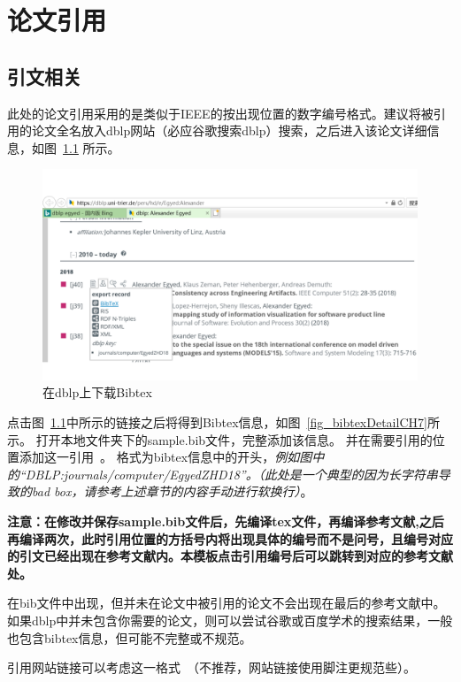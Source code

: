 \chapter{论文引用}

\section{引文相关}
此处的论文引用采用的是类似于IEEE的按出现位置的数字编号格式。建议将被引用的论文全名放入dblp网站（必应谷歌搜索dblp）搜索，之后进入该论文详细信息，如图~\ref{fig_dblpForBibtexCH7} 所示。

\begin{figure}[htb]
  \centering
  \includegraphics[width=5in]{figure/chapter7/dblpForBibtex.pdf}
  \caption{在dblp上下载Bibtex}\label{fig_dblpForBibtexCH7}
\end{figure}

点击图~\ref{fig_dblpForBibtexCH7}中所示的链接之后将得到Bibtex信息，如图~\ref{fig_bibtexDetailCH7}所示。
打开本地文件夹下的sample.bib文件，完整添加该信息。
并在需要引用的位置添加这一引用~\cite{DBLP:journals/computer/EgyedZHD18}。
格式为bibtex信息中的开头，\emph{例如图中的“DBLP:journals/computer/EgyedZHD18”。（此处是一个典型的因为长字符串导致的bad box，请参考上述章节的内容手动进行软换行）}。

\textbf{注意：在修改并保存sample.bib文件后，先编译tex文件，再编译参考文献,之后再编译两次，此时引用位置的方括号内将出现具体的编号而不是问号，且编号对应的引文已经出现在参考文献内。本模板点击引用编号后可以跳转到对应的参考文献处。}

在bib文件中出现，但并未在论文中被引用的论文不会出现在最后的参考文献中。如果dblp中并未包含你需要的论文，则可以尝试谷歌或百度学术的搜索结果，一般也包含bibtex信息，但可能不完整或不规范。

引用网站链接可以考虑这一格式~\cite{GanttSystemWeb}（不推荐，网站链接使用脚注更规范些）。

